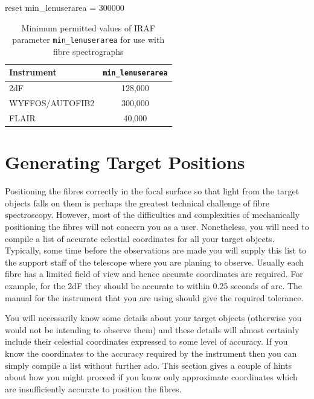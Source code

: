 \documentclass[chapters,twoside,11pt]{starlink}
\begin{document}
\begin{terminalv}
reset min_lenuserarea  =  300000
\end{terminalv}

\begin{table}[htbp]

\begin{center}
\begin{tabular}{lc}
Instrument      & \texttt{min\_lenuserarea} \\ \hline
2dF             & 128,000 \\
WYFFOS/AUTOFIB2 & 300,000 \\
FLAIR           &  40,000 \\
\end{tabular}
\end{center}

\caption[Values of IRAF parameter \texttt{min\_lenuserarea} for fibre
spectrographs]{Minimum permitted values of IRAF parameter \texttt{min\_lenuserarea} for use with fibre spectrographs
\label{MINLENUSERAREA} }

\end{table}


\section{\label{TARGET}Generating Target Positions}

Positioning the fibres correctly in the focal surface so that light
from the target objects falls on them is perhaps the greatest technical
challenge of fibre spectroscopy.  However, most of the difficulties and
complexities of mechanically positioning the fibres will not concern
you as a user.  Nonetheless, you will need to compile a list of accurate
celestial coordinates for all your target objects.  Typically, some
time before the observations are made you will supply this list to
the support staff of the telescope where you are planing to observe.
Usually each fibre has a limited field of view and hence accurate
coordinates are required.  For example, for the 2dF they should be
accurate to within 0.25 seconds of arc.  The manual for the instrument
that you are using should give the required tolerance.

You will necessarily know some details about your target objects
(otherwise you would not be intending to observe them) and these details
will almost certainly include their celestial coordinates expressed to
some level of accuracy.  If you know the coordinates to the accuracy
required by the instrument then you can simply compile a list without
further ado.  This section gives a couple of hints about how you might
proceed if you know only approximate coordinates which are
insufficiently accurate to position the fibres.
\end{document}
